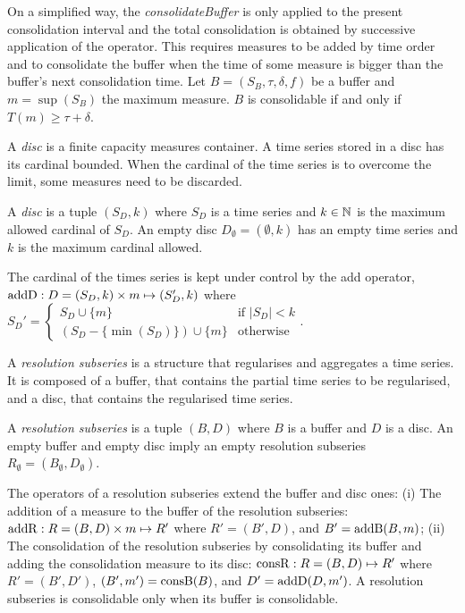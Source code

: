 On a simplified way, the \emph{consolidateBuffer} is only applied to the present
consolidation interval and the total consolidation is obtained by
successive application of the operator. This requires measures to be
added by time order and to consolidate the buffer when the time of
some measure is bigger than the buffer's next consolidation time.  Let
$B=(S_B,\tau,\delta,f)$ be a buffer and $m=\sup(S_B)$ the maximum
measure. $B$ is consolidable if and only if $T(m) \geq
\tau+\delta$.


A \emph{disc} is a finite capacity measures container. A time series
stored in a disc has its cardinal bounded. When the cardinal of the
time series is to overcome the limit, some measures need to be
discarded.
\begin{definition}%
  A \emph{disc} is a tuple $(S_D,k)$ where $S_D$ is a time series and
  $k\in\mathbb{N}$ is the maximum allowed cardinal of $S_D$.  An empty disc
  $D_{\emptyset} = (\emptyset,k)$ has an empty time series and $k$ is
  the maximum cardinal allowed.
\end{definition}

The cardinal of the times series is kept under control by the add
operator, $\operatorname{addD} : D=(S_D,k)\times m\mapsto (S'_D,k)$ where %
$
 S_D' = \begin{cases}
  S_D\cup\{m\}                 & \text{if } |S_D|<k  \\
  (S_D-\{\min(S_D)\}) \cup \{m\} & \text{otherwise}
\end{cases}  
$.


A \emph{resolution subseries} is a structure that regularises and
aggregates a time series. It is composed of a buffer, that contains
the partial time series to be regularised, and a disc, that contains
the regularised time series.
\begin{definition}%
  A \emph{resolution subseries} is a tuple $(B,D)$ where $B$ is a
  buffer and $D$ is a disc.  An empty buffer and empty disc imply an
  empty resolution subseries $R_{\emptyset} =
  (B_{\emptyset},D_{\emptyset})$.
\end{definition}
 
The operators of a resolution subseries extend the buffer and disc
ones: (i) The addition of a measure to the buffer of the resolution
subseries: $\operatorname{addR} : R=(B,D) \times m \mapsto R'$ where $R'= (B',D)$,
and $B'= \operatorname{addB}(B,m)$; (ii) The consolidation of the resolution
subseries by consolidating its buffer and adding the consolidation
measure to its disc: $\operatorname{consR} : R=(B,D) \mapsto R'$ where $R'=
(B',D')$, $(B',m') = \operatorname{consB}(B)$, and $D'= \operatorname{addD}(D,m')$.  A resolution
subseries is consolidable only when its buffer is consolidable.




